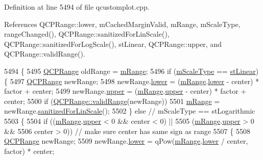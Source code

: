 Definition at line 5494 of file qcustomplot.\+cpp.



References Q\+C\+P\+Range\+::lower, m\+Cached\+Margin\+Valid, m\+Range, m\+Scale\+Type, range\+Changed(), Q\+C\+P\+Range\+::sanitized\+For\+Lin\+Scale(), Q\+C\+P\+Range\+::sanitized\+For\+Log\+Scale(), st\+Linear, Q\+C\+P\+Range\+::upper, and Q\+C\+P\+Range\+::valid\+Range().


\begin{DoxyCode}
5494                                                      \{
5495   \hyperlink{class_q_c_p_range}{QCPRange} oldRange = \hyperlink{class_q_c_p_axis_a1ee36773c49062d751560e11f90845f7}{mRange};
5496   \textcolor{keywordflow}{if} (\hyperlink{class_q_c_p_axis_ad706039549cbbbec5fcb2baf7894e04d}{mScaleType} == \hyperlink{class_q_c_p_axis_a36d8e8658dbaa179bf2aeb973db2d6f0aff6e30a11a828bc850caffab0ff994f6}{stLinear}) \{
5497     \hyperlink{class_q_c_p_range}{QCPRange} newRange;
5498     newRange.\hyperlink{class_q_c_p_range_aa3aca3edb14f7ca0c85d912647b91745}{lower} = (\hyperlink{class_q_c_p_axis_a1ee36773c49062d751560e11f90845f7}{mRange}.\hyperlink{class_q_c_p_range_aa3aca3edb14f7ca0c85d912647b91745}{lower} - center) * factor + center;
5499     newRange.\hyperlink{class_q_c_p_range_ae44eb3aafe1d0e2ed34b499b6d2e074f}{upper} = (\hyperlink{class_q_c_p_axis_a1ee36773c49062d751560e11f90845f7}{mRange}.\hyperlink{class_q_c_p_range_ae44eb3aafe1d0e2ed34b499b6d2e074f}{upper} - center) * factor + center;
5500     \textcolor{keywordflow}{if} (\hyperlink{class_q_c_p_range_ab38bd4841c77c7bb86c9eea0f142dcc0}{QCPRange::validRange}(newRange))
5501       \hyperlink{class_q_c_p_axis_a1ee36773c49062d751560e11f90845f7}{mRange} = newRange.\hyperlink{class_q_c_p_range_a1ff029704c29a75adbc1dc36cecaf44c}{sanitizedForLinScale}();
5502   \} \textcolor{keywordflow}{else} \textcolor{comment}{// mScaleType == stLogarithmic}
5503   \{
5504     \textcolor{keywordflow}{if} ((\hyperlink{class_q_c_p_axis_a1ee36773c49062d751560e11f90845f7}{mRange}.\hyperlink{class_q_c_p_range_ae44eb3aafe1d0e2ed34b499b6d2e074f}{upper} < 0 && center < 0) ||
5505         (\hyperlink{class_q_c_p_axis_a1ee36773c49062d751560e11f90845f7}{mRange}.\hyperlink{class_q_c_p_range_ae44eb3aafe1d0e2ed34b499b6d2e074f}{upper} > 0 &&
5506          center > 0)) \textcolor{comment}{// make sure center has same sign as range}
5507     \{
5508       \hyperlink{class_q_c_p_range}{QCPRange} newRange;
5509       newRange.\hyperlink{class_q_c_p_range_aa3aca3edb14f7ca0c85d912647b91745}{lower} = qPow(\hyperlink{class_q_c_p_axis_a1ee36773c49062d751560e11f90845f7}{mRange}.\hyperlink{class_q_c_p_range_aa3aca3edb14f7ca0c85d912647b91745}{lower} / center, factor) * center;

\end{DoxyCode}
